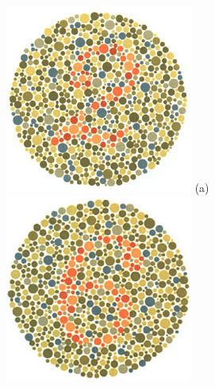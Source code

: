 \documentclass[	12pt, Times, openright, twoside, a4paper, english, brazil]{abntex2}
\begin{document}
\begin{apendicesenv}
\begin{figure}[!htb]
\centering
{\includegraphics[width=\linewidth]{ishihara-fuga/plate10.png}}
(a)
\endminipage\hfill
{}
\centering
{\includegraphics[width=\linewidth]{ishihara-fuga/plate11.png}}

\end{figure}
\end{apendicesenv}
\end{document}
